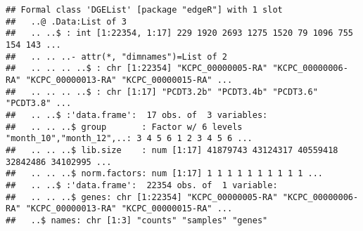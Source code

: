 \documentclass[]{article}
\newenvironment{Shaded}{\begin{snugshade}}{\end{snugshade}}
\newcommand{\CommentTok}[1]{\textcolor[rgb]{0.56,0.35,0.01}{\textit{#1}}}
\newcommand{\DataTypeTok}[1]{\textcolor[rgb]{0.13,0.29,0.53}{#1}}
\newcommand{\KeywordTok}[1]{\textcolor[rgb]{0.13,0.29,0.53}{\textbf{#1}}}
\newcommand{\NormalTok}[1]{#1}
\newcommand{\OperatorTok}[1]{\textcolor[rgb]{0.81,0.36,0.00}{\textbf{#1}}}
\newcommand{\StringTok}[1]{\textcolor[rgb]{0.31,0.60,0.02}{#1}}
\begin{document}
\begin{Shaded}
\end{Shaded}

\begin{verbatim}
## Formal class 'DGEList' [package "edgeR"] with 1 slot
##   ..@ .Data:List of 3
##   .. ..$ : int [1:22354, 1:17] 229 1920 2693 1275 1520 79 1096 755 154 143 ...
##   .. .. ..- attr(*, "dimnames")=List of 2
##   .. .. .. ..$ : chr [1:22354] "KCPC_00000005-RA" "KCPC_00000006-RA" "KCPC_00000013-RA" "KCPC_00000015-RA" ...
##   .. .. .. ..$ : chr [1:17] "PCDT3.2b" "PCDT3.4b" "PCDT3.6" "PCDT3.8" ...
##   .. ..$ :'data.frame':  17 obs. of  3 variables:
##   .. .. ..$ group       : Factor w/ 6 levels "month_10","month_12",..: 3 4 5 6 1 2 3 4 5 6 ...
##   .. .. ..$ lib.size    : num [1:17] 41879743 43124317 40559418 32842486 34102995 ...
##   .. .. ..$ norm.factors: num [1:17] 1 1 1 1 1 1 1 1 1 1 ...
##   .. ..$ :'data.frame':  22354 obs. of  1 variable:
##   .. .. ..$ genes: chr [1:22354] "KCPC_00000005-RA" "KCPC_00000006-RA" "KCPC_00000013-RA" "KCPC_00000015-RA" ...
##   ..$ names: chr [1:3] "counts" "samples" "genes"
\end{verbatim}

\begin{Shaded}
\end{Shaded}
\end{document}
